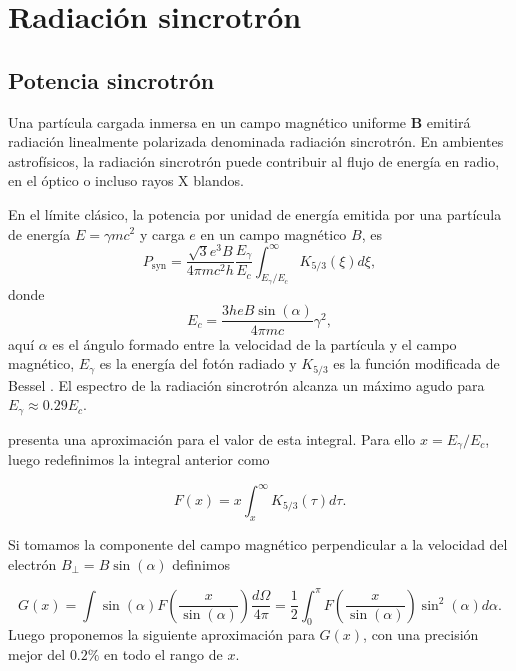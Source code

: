 \chapter{Radiaci\'on sincrotrón}\label{cha:apx1}

\section{Potencia sincrotr\'on}

Una partícula cargada inmersa en un campo magnético uniforme \textbf{B} emitirá radiación linealmente polarizada denominada radiación sincrotrón. En ambientes astrofísicos, la radiación sincrotrón puede contribuir al flujo de energía
en radio, en el óptico o incluso rayos X blandos. 

En el l\'imite clásico, la potencia por unidad de energía emitida por una partícula de energía $E=\gamma mc^2$ y carga $e$ en un campo magnético $B$, es 
\begin{equation}\label{eq:marco-2}
    P_{\text{syn}}=\frac{\sqrt{3}e^3B}{4\pi mc^2h}\frac{E_\gamma}{E_c}\int_{{E_\gamma}/{E_c}}^\infty K_{5/3}(\xi)d\xi,
\end{equation}
donde
\begin{equation}\label{eq:marco-3}
    E_c=\frac{3heB\sin(\alpha)}{4\pi mc}\gamma^2,
\end{equation}
aquí $\alpha$ es el ángulo formado entre la velocidad de la partícula y el campo magnético, $E_\gamma$ es la energía del fotón radiado y $K_{5/3}$ es la función modificada de Bessel \citep{Blumenthal1970}. El espectro de la radiación sincrotrón alcanza un máximo agudo para $E_\gamma\approx0.29E_c$.

\cite{Aharonian2010} presenta una aproximación para el valor de esta integral. Para ello $x={E_\gamma}/{E_c}$, luego redefinimos la integral anterior como

\begin{equation}\label{eq:mod-28}
    F(x)=x\int_x^\infty K_{5/3}(\tau)d\tau.
\end{equation}

Si tomamos la componente del campo magnético perpendicular a la velocidad del electrón $B_\perp=B\sin(\alpha)$ definimos

\begin{equation}\label{eq:mod-29}
    G(x)=\int\sin(\alpha)F\left(\frac{x}{\sin(\alpha)}\right)\frac{d\Omega}{4\pi}=\frac{1}{2}\int_0^\pi F\left(\frac{x}{\sin(\alpha)}\right)\sin^2(\alpha)d\alpha.
\end{equation}
Luego proponemos la siguiente aproximación para $G(x)$, con una precisión mejor del $0.2\%$ en todo el rango de $x$.

